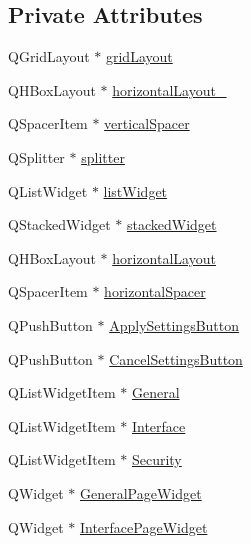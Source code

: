 \subsection*{Private Attributes}
\begin{DoxyCompactItemize}
\item 
Q\+Grid\+Layout $\ast$ \hyperlink{class_matty_settings_dialog_abeac8450990b1e5e996992e1ab9410f9}{grid\+Layout}
\item 
Q\+H\+Box\+Layout $\ast$ \hyperlink{class_matty_settings_dialog_a035ddbfc2982a8734ae44f5fb57fa871}{horizontal\+Layout\+\_}
\item 
Q\+Spacer\+Item $\ast$ \hyperlink{class_matty_settings_dialog_a7fd31624e0d2669cedf9ca4f107ee559}{vertical\+Spacer}
\item 
Q\+Splitter $\ast$ \hyperlink{class_matty_settings_dialog_abf46bc7f601ae7f9f1474376c80050dd}{splitter}
\item 
Q\+List\+Widget $\ast$ \hyperlink{class_matty_settings_dialog_a2243eadd55f6e1d25b8b9717820c4d13}{list\+Widget}
\item 
Q\+Stacked\+Widget $\ast$ \hyperlink{class_matty_settings_dialog_a394681c4be16aca0a50404a04ca49d9a}{stacked\+Widget}
\item 
Q\+H\+Box\+Layout $\ast$ \hyperlink{class_matty_settings_dialog_acdecac011cbcc9ad9ab21e7d900a990e}{horizontal\+Layout}
\item 
Q\+Spacer\+Item $\ast$ \hyperlink{class_matty_settings_dialog_a0772d1a8a5bfc384eb2a9044f2fbeefb}{horizontal\+Spacer}
\item 
Q\+Push\+Button $\ast$ \hyperlink{class_matty_settings_dialog_ac7e698cb25a3a71192488d8100b60d04}{Apply\+Settings\+Button}
\item 
Q\+Push\+Button $\ast$ \hyperlink{class_matty_settings_dialog_a26f0c5b47cb75f1fed8fddfbad59f174}{Cancel\+Settings\+Button}
\item 
Q\+List\+Widget\+Item $\ast$ \hyperlink{class_matty_settings_dialog_a5f12126027ce73f0e7e554322d8a46c9}{General}
\item 
Q\+List\+Widget\+Item $\ast$ \hyperlink{class_matty_settings_dialog_aa507ec4d06a64cbc2f6748c67ff0df1e}{Interface}
\item 
Q\+List\+Widget\+Item $\ast$ \hyperlink{class_matty_settings_dialog_a1f96950ec3adabcad3a25926649c739b}{Security}
\item 
Q\+Widget $\ast$ \hyperlink{class_matty_settings_dialog_af9ea43e4ed86bbcce00c3e33ba360455}{General\+Page\+Widget}
\item 
Q\+Widget $\ast$ \hyperlink{class_matty_settings_dialog_aa5207929e832b669595789eb430320cb}{Interface\+Page\+Widget}

\end{DoxyCompactItemize}
